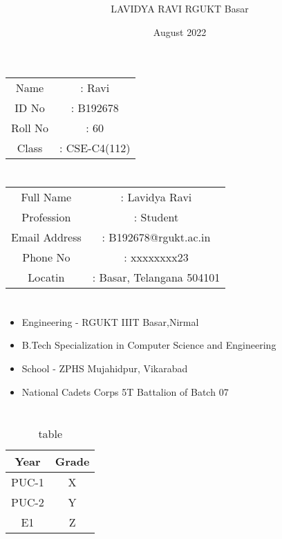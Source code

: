 \documentclass{article}
\title{\Huge\textbf{\color{red}{RESUME}}}
\author{LAVIDYA RAVI RGUKT Basar}
\date{August 2022}
\begin{document}
\maketitle

\section{\textbf{\color{green}{Introduction:}}}
\begin{table}[h]
 \begin{tabular}{c c}
 Name &: Ravi \\
 ID No   &: B192678 \\
 Roll No&: 60 \\
 Class &: CSE-C4(112) \\
 \end{tabular}
 \end{table}
 
 
 \section{\textbf{\color{green}{Personal Information:}}}
 \begin{table}[h]
  \begin{tabular}{c c}
 Full Name &: Lavidya Ravi \\
 Profession &: Student \\
 Email Address &: B192678@rgukt.ac.in  \\
 Phone No &: xxxxxxxx23 \\
 Locatin  &: Basar, Telangana 504101 \\
 \end{tabular}
 \end{table}
 
 \section{\textbf{\color{green}{Education and Qualification}}}
 \begin{itemize}
 \item{Engineering - RGUKT IIIT Basar,Nirmal}
 \item{B.Tech Specialization in Computer Science and Engineering}
 \item{School - ZPHS Mujahidpur, Vikarabad}
 \item{National Cadets Corps 5T Battalion of Batch 07}
  \end{itemize}
  
\pagebreak
\section{\color{green}{Grades}}
\begin{table}[h]
    \centering
    \begin{tabular}{|c|c|} 
   \hline
     Year  & Grade \\ \hline \hline
     PUC-1   &  X\\ \hline 
     PUC-2 &  Y \\ \hline
     E1 & Z  \\  \hline
     \end{tabular}
     \caption{table}
     \end{table}
     
\end{document}
